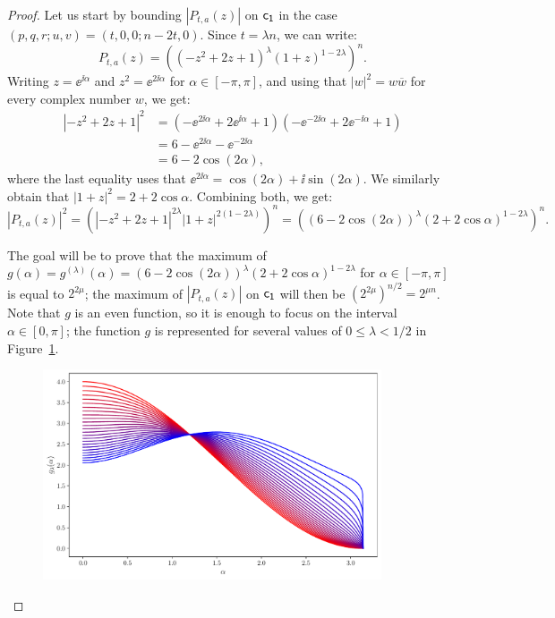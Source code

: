 \documentclass[11pt]{llncs}
\begin{document}
\begin{proof}
    Let us start by bounding $|P_{t,a}(z)|$ on $\mathsf{c_1}$ in the case $(p,q,r;u,v)=(t,0,0;n-2t,0)$. Since $t=\lambda n$, we can write:
    \[
        P_{t,a}(z)=\left((-z^2+2z+1)^{\lambda}(1+z)^{1-2\lambda}\right)^n.
    \]
    Writing $z=\ee^{\ii\alpha}$ and $z^2=\ee^{2\ii\alpha}$ for $\alpha\in[-\pi,\pi]$, and using that $|w|^2=w\overline w$ for every complex number $w$, we get:
    \begin{align*}
        |-z^2+2z+1|^2&=\left(-\ee^{2\ii\alpha}+2\ee^{\ii\alpha}+1\right)\left(-\ee^{-2\ii\alpha}+2\ee^{-\ii\alpha}+1\right)\\
        &=6-\ee^{2\ii\alpha}-\ee^{-2\ii\alpha}\\
        &=6-2\cos (2\alpha),
    \end{align*}
    where the last equality uses that $\ee^{2\ii\alpha}=\cos(2\alpha)+\ii\sin(2\alpha)$. We similarly obtain that $|1+z|^2=2+2\cos\alpha$. Combining both, we get:   
    \[
        |P_{t,a}(z)|^2=\left(\left|-z^2+2z+1\right|^{2\lambda}|1+z|^{2(1-2\lambda)}\right)^n=\left((6-2\cos(2\alpha))^\lambda(2+2\cos\alpha)^{1-2\lambda}\right)^n.
    \]
    
    The goal will be to prove that the maximum of $g(\alpha)=g^{(\lambda)}(\alpha)=(6-2\cos(2\alpha))^\lambda(2+2\cos\alpha)^{1-2\lambda}$ for $\alpha\in[-\pi,\pi]$ is equal to $2^{2\mu}$; the maximum of $|P_{t,a}(z)|$ on $\mathsf{c_1}$ will then be $\left(2^{2\mu}\right)^{n/2}=2^{\mu n}$. Note that $g$ is an even function, so it is enough to focus on the interval $\alpha\in[0,\pi]$; the function $g$ is represented for several values of $0\leq\lambda<1/2$ in Figure~\ref{fig:family_curves_g}.

    \begin{figure}[ht]
    	\centering
    	\includegraphics[width=10cm]{family_curves_g.pdf}
        \vspace{-4mm}
    	\label{fig:family_curves_g}
    \end{figure}
    

\end{proof}
\end{document}

